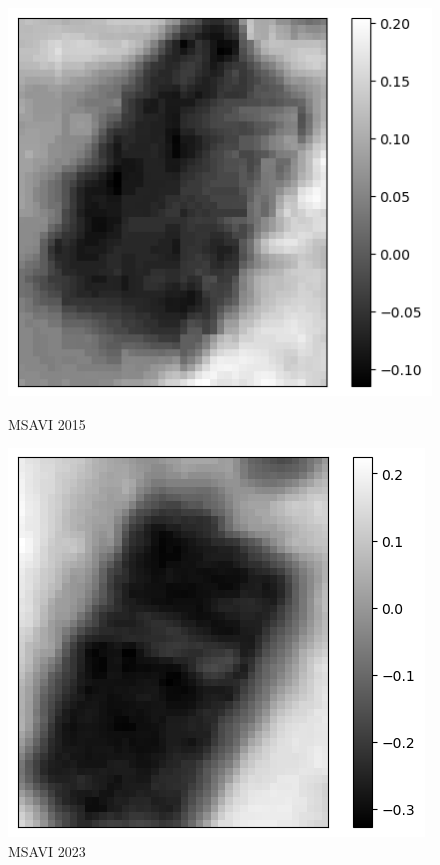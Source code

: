 \documentclass[a4paper,12pt]{article}  %
\begin{document}
\begin{figure}[H]
    \centering
    \begin{minipage}{0.45\textwidth}
        \centering
        \includegraphics[width=\linewidth]{spektralne/msavi_budynek3_2015.png}
        \caption*{MSAVI 2015}
    \end{minipage}
    \begin{minipage}{0.45\textwidth}
        \centering
        \includegraphics[width=\linewidth]{spektralne/msavi_budynek3_2023.png}
        \caption*{MSAVI 2023}
    \end{minipage}
\end{figure}
\end{document}
